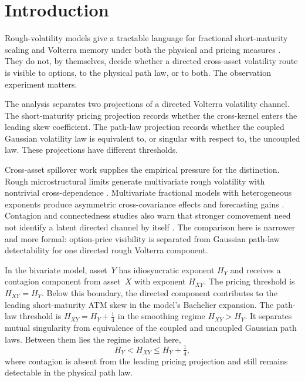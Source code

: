 \documentclass[11pt,a4paper]{amsart}
\theoremstyle{plain}
\theoremstyle{definition}
\theoremstyle{remark}
\begin{document}
\section{Introduction}\label{sec:intro}

Rough-volatility models give a tractable language for fractional short-maturity scaling and
Volterra memory under both the physical and pricing measures
\cite{GJR18,BFG16,EER19,ABLP19,Liv18}.  They do not, by themselves, decide whether a directed
cross-asset volatility route is visible to options, to the physical path law, or to both.  The
observation experiment matters.

The analysis separates two projections of a directed Volterra volatility channel.  The
short-maturity pricing projection records whether the cross-kernel enters the leading skew
coefficient.  The path-law projection records whether the coupled Gaussian volatility law is
equivalent to, or singular with respect to, the uncoupled law.  These projections have different
thresholds.

Cross-asset spillover work supplies the empirical pressure for the distinction.  Rough
microstructural limits generate multivariate rough volatility with nontrivial cross-dependence
\cite{TR21}.  Multivariate fractional models with heterogeneous exponents produce asymmetric
cross-covariance effects and forecasting gains \cite{DGP24,LPS09,BYZ25}.  Contagion and
connectedness studies also warn that stronger comovement need not identify a latent directed
channel by itself \cite{FR02,PS03,DY12,BK18}.  The comparison here is narrower and more formal:
option-price visibility is separated from Gaussian path-law detectability for one directed rough
Volterra component.

In the bivariate model, asset~$Y$ has idiosyncratic exponent $H_Y$ and receives a contagion
component from asset~$X$ with exponent $H_{XY}$.  The pricing threshold is
$H_{XY}=H_Y$.  Below this boundary, the directed component contributes to the leading
short-maturity ATM skew in the model's Bachelier expansion.  The path-law threshold is
$H_{XY}=H_Y+\tfrac14$ in the smoothing regime $H_{XY}>H_Y$.  It separates mutual singularity from
equivalence of the coupled and uncoupled Gaussian path laws.  Between them lies the regime isolated
here,
\[
H_Y < H_{XY}\le H_Y+\tfrac14,
\]
where contagion is absent from the leading pricing projection and still remains detectable in the
physical path law.
\end{document}
